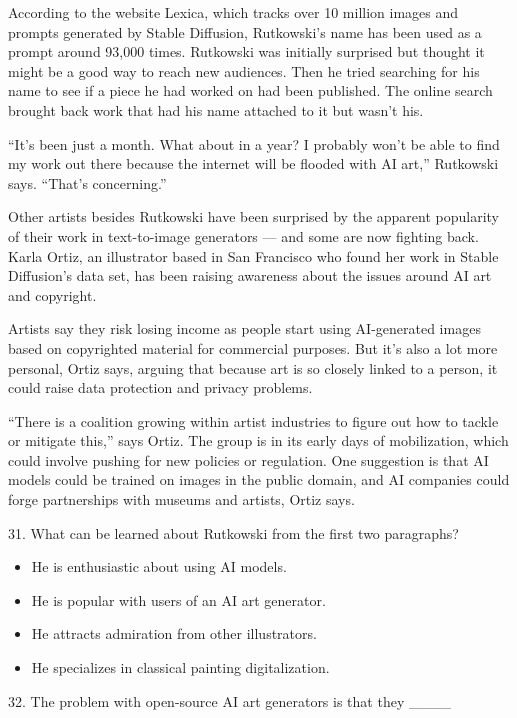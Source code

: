 \documentclass[UTF8,11pt]{ctexart}
\begin{document}
According to the website Lexica, which tracks over 10 million images and prompts generated by Stable Diffusion, Rutkowski’s name has been used as a prompt around 93,000 times. Rutkowski was initially surprised but thought it might be a good way to reach new audiences. Then he tried searching for his name to see if a piece he had worked on had been published. The online search brought back work that had his name attached to it but wasn’t his.


“It’s been just a month. What about in a year? I probably won’t be able to find my work out there because the internet will be flooded with AI art,” Rutkowski says. “That’s concerning.”


Other artists besides Rutkowski have been surprised by the apparent popularity of their work in text-to-image generators — and some are now fighting back. Karla Ortiz, an illustrator based in San Francisco who found her work in Stable Diffusion’s data set, has been raising awareness about the issues around AI art and copyright.


Artists say they risk losing income as people start using AI-generated images based on copyrighted material for commercial purposes. But it’s also a lot more personal, Ortiz says, arguing that because art is so closely linked to a person, it could raise data protection and privacy problems.


“There is a coalition growing within artist industries to figure out how to tackle or mitigate this,” says Ortiz. The group is in its early days of mobilization, which could involve pushing for new policies or regulation. One suggestion is that AI models could be trained on images in the public domain, and AI companies could forge partnerships with museums and artists, Ortiz says.


31. What can be learned about Rutkowski from the first two paragraphs?


\begin{itemize}[leftmargin=2em,itemsep=.2em,topsep=.4em]\item[A.] He is enthusiastic about using AI models.
\item[B.] He is popular with users of an AI art generator.
\item[C.] He attracts admiration from other illustrators.
\item[D.] He specializes in classical painting digitalization.
\end{itemize}

32. The problem with open-source AI art generators is that they \_\_\_\_
\end{document}
